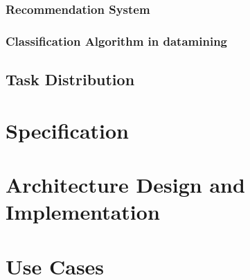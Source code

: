 \documentclass[conference]{IEEEtran}
\begin{document}
\subsubsection{Recommendation System }
\subsubsection{Classification Algorithm in datamining}


\subsection{Task Distribution}


\section{Specification}
\section{Architecture Design and Implementation}
\section{Use Cases}






%
%

\end{document}
